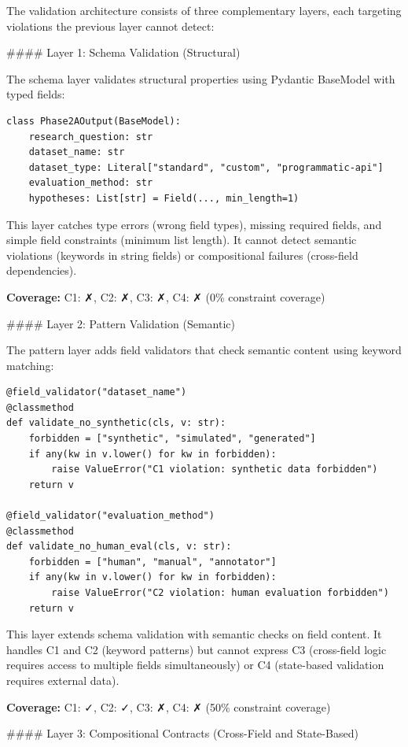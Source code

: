 The validation architecture consists of three complementary layers, each targeting violations the previous layer cannot detect:

\#\#\#\# Layer 1: Schema Validation (Structural)

The schema layer validates structural properties using Pydantic BaseModel with typed fields:

\begin{verbatim}
class Phase2AOutput(BaseModel):
    research_question: str
    dataset_name: str
    dataset_type: Literal["standard", "custom", "programmatic-api"]
    evaluation_method: str
    hypotheses: List[str] = Field(..., min_length=1)
\end{verbatim}

This layer catches type errors (wrong field types), missing required fields, and simple field constraints (minimum list length). It cannot detect semantic violations (keywords in string fields) or compositional failures (cross-field dependencies).

\textbf{Coverage:} C1: ✗, C2: ✗, C3: ✗, C4: ✗ (0\% constraint coverage)

\#\#\#\# Layer 2: Pattern Validation (Semantic)

The pattern layer adds field validators that check semantic content using keyword matching:

\begin{verbatim}
@field_validator("dataset_name")
@classmethod
def validate_no_synthetic(cls, v: str):
    forbidden = ["synthetic", "simulated", "generated"]
    if any(kw in v.lower() for kw in forbidden):
        raise ValueError("C1 violation: synthetic data forbidden")
    return v

@field_validator("evaluation_method")
@classmethod
def validate_no_human_eval(cls, v: str):
    forbidden = ["human", "manual", "annotator"]
    if any(kw in v.lower() for kw in forbidden):
        raise ValueError("C2 violation: human evaluation forbidden")
    return v
\end{verbatim}

This layer extends schema validation with semantic checks on field content. It handles C1 and C2 (keyword patterns) but cannot express C3 (cross-field logic requires access to multiple fields simultaneously) or C4 (state-based validation requires external data).

\textbf{Coverage:} C1: ✓, C2: ✓, C3: ✗, C4: ✗ (50\% constraint coverage)

\#\#\#\# Layer 3: Compositional Contracts (Cross-Field and State-Based)

